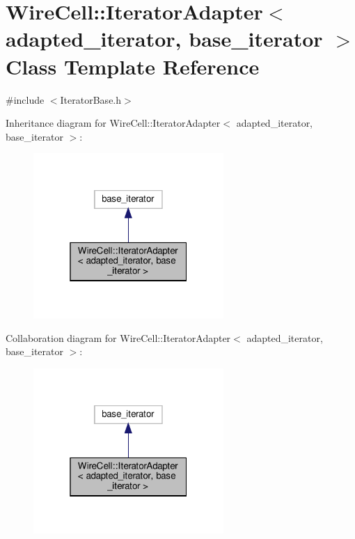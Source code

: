 \hypertarget{class_wire_cell_1_1_iterator_adapter}{}\section{Wire\+Cell\+:\+:Iterator\+Adapter$<$ adapted\+\_\+iterator, base\+\_\+iterator $>$ Class Template Reference}
\label{class_wire_cell_1_1_iterator_adapter}


{\ttfamily \#include $<$Iterator\+Base.\+h$>$}



Inheritance diagram for Wire\+Cell\+:\+:Iterator\+Adapter$<$ adapted\+\_\+iterator, base\+\_\+iterator $>$\+:
\nopagebreak
\begin{figure}[H]
\begin{center}
\leavevmode
\includegraphics[width=205pt]{class_wire_cell_1_1_iterator_adapter__inherit__graph}
\end{center}
\end{figure}


Collaboration diagram for Wire\+Cell\+:\+:Iterator\+Adapter$<$ adapted\+\_\+iterator, base\+\_\+iterator $>$\+:
\nopagebreak
\begin{figure}[H]
\begin{center}
\leavevmode
\includegraphics[width=205pt]{class_wire_cell_1_1_iterator_adapter__coll__graph}
\end{center}
\end{figure}
